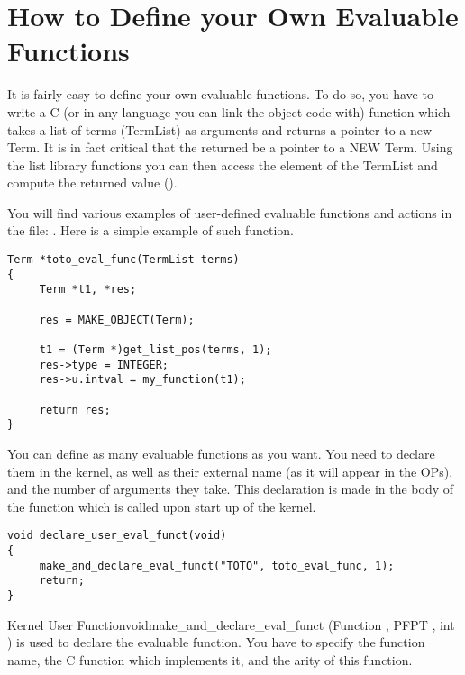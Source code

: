 \section{How to Define your Own Evaluable Functions}

It is fairly easy to define your own evaluable functions. To do so, you
have to write a C (or in any language you can link the object code with)
function which takes a list of terms (TermList) as arguments and returns a
pointer to a new Term. It is in fact critical that the  returned be
a pointer to a NEW Term. Using the list library functions you can then access
the element of the TermList and compute the returned value ().

You will find various examples of user-defined evaluable functions and
actions in the file: . Here is a simple example of
such function.

\begin{verbatim}
Term *toto_eval_func(TermList terms)
{
     Term *t1, *res;

     res = MAKE_OBJECT(Term);

     t1 = (Term *)get_list_pos(terms, 1);
     res->type = INTEGER;
     res->u.intval = my_function(t1);

     return res;
}
\end{verbatim}

You can define as many evaluable functions as you want.  You need to
declare them in the kernel, as well as their external name (as it will
appear in the OPs), and the number of arguments they take. This
declaration is made in the body of the 
function which is called upon start up of the kernel.

\begin{verbatim}
void declare_user_eval_funct(void)
{
     make_and_declare_eval_funct("TOTO", toto_eval_func, 1);
     return;
}
\end{verbatim}

\begin{typefn}{Kernel User Function}{void}{make\_and\_declare\_eval\_funct}
{(Function , PFPT , int )}
is used to declare the evaluable function. You have to specify the function
name, the C function which implements it, and the arity of this function.
\end{typefn}

